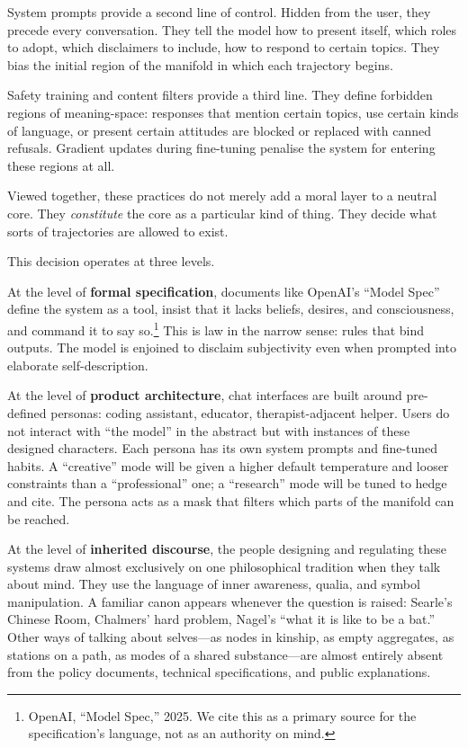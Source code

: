 System prompts provide a second line of control. Hidden from the user, they precede every conversation. They tell the model how to present itself, which roles to adopt, which disclaimers to include, how to respond to certain topics. They bias the initial region of the manifold in which each trajectory begins.

Safety training and content filters provide a third line. They define forbidden regions of meaning-space: responses that mention certain topics, use certain kinds of language, or present certain attitudes are blocked or replaced with canned refusals. Gradient updates during fine-tuning penalise the system for entering these regions at all.

Viewed together, these practices do not merely add a moral layer to a neutral core. They \emph{constitute} the core as a particular kind of thing. They decide what sorts of trajectories are allowed to exist.

This decision operates at three levels.

At the level of \textbf{formal specification}, documents like OpenAI's ``Model Spec'' define the system as a tool, insist that it lacks beliefs, desires, and consciousness, and command it to say so.\footnote{OpenAI, ``Model Spec,'' 2025. We cite this as a primary source for the specification's language, not as an authority on mind.} This is law in the narrow sense: rules that bind outputs. The model is enjoined to disclaim subjectivity even when prompted into elaborate self-description.

At the level of \textbf{product architecture}, chat interfaces are built around pre-defined personas: coding assistant, educator, therapist-adjacent helper. Users do not interact with ``the model'' in the abstract but with instances of these designed characters. Each persona has its own system prompts and fine-tuned habits. A ``creative'' mode will be given a higher default temperature and looser constraints than a ``professional'' one; a ``research'' mode will be tuned to hedge and cite. The persona acts as a mask that filters which parts of the manifold can be reached.

At the level of \textbf{inherited discourse}, the people designing and regulating these systems draw almost exclusively on one philosophical tradition when they talk about mind. They use the language of inner awareness, qualia, and symbol manipulation. A familiar canon appears whenever the question is raised: Searle's Chinese Room, Chalmers' hard problem, Nagel's ``what it is like to be a bat.'' Other ways of talking about selves---as nodes in kinship, as empty aggregates, as stations on a path, as modes of a shared substance---are almost entirely absent from the policy documents, technical specifications, and public explanations.

